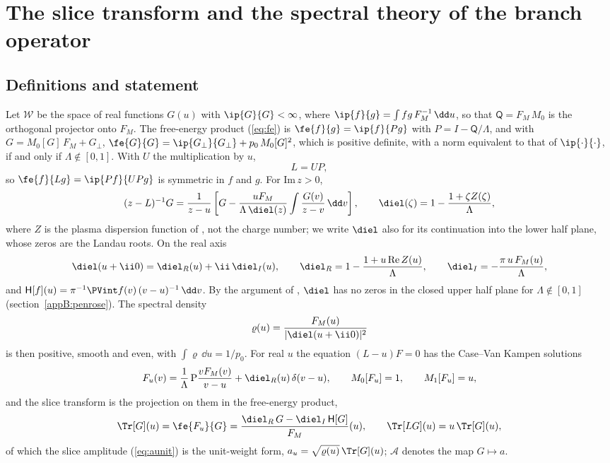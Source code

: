 \section{The slice transform and the spectral theory of the branch operator}\label{app:spectral}

\subsection{Definitions and statement}\label{appB:defs}

Let $\mathcal W$ be the space of real functions $G(u)$ with $\ip{G}{G}<\infty$, where $\ip{f}{g}=\int fg\,F_M^{-1}\,\dd u$, so that $\mathsf Q=F_M\,M_0$ is the orthogonal projector onto $F_M$. The free-energy product (\ref{eq:fe}) is $\fe{f}{g}=\ip{f}{Pg}$ with $P=I-\mathsf Q/\Lambda$, and with $G=M_0[G]\,F_M+G_\perp$, $\fe{G}{G}=\ip{G_\perp}{G_\perp}+p_0\,M_0[G]^2$, which is positive definite, with a norm equivalent to that of $\ip{\cdot}{\cdot}$, if and only if $\Lambda\notin[0,1]$. With $U$ the multiplication by $u$,
\begin{equation}\label{eq:LUP}
  L=UP ,
\end{equation}
so $\fe{f}{Lg}=\ip{Pf}{UPg}$ is symmetric in $f$ and $g$. For $\mathrm{Im}\,z>0$,
\begin{equation}\label{sl:resolvent}
  (z-L)^{-1}G=\frac{1}{z-u}\left[G-\frac{uF_M}{\Lambda\,\diel(z)}\int\frac{G(v)}{z-v}\,\dd v\right],\qquad
  \diel(\zeta)=1-\frac{1+\zeta Z(\zeta)}{\Lambda},
\end{equation}
where $Z$ is the plasma dispersion function of \citet{FriedConte1961}, not the charge number; we write $\diel$ also for its continuation into the lower half plane, whose zeros are the Landau roots. On the real axis
\begin{equation}\label{sl:epsRI}
  \diel(u+\ii0)=\diel_R(u)+\ii\,\diel_I(u),\qquad
  \diel_R=1-\frac{1+u\,\mathrm{Re}\,Z(u)}{\Lambda},\qquad
  \diel_I=-\frac{\pi\,u\,F_M(u)}{\Lambda},
\end{equation}
and $\mathsf H[f](u)=\pi^{-1}\PVint f(v)\,(v-u)^{-1}\,\dd v$. By the argument of \citet{Penrose1960}, $\diel$ has no zeros in the closed upper half plane for $\Lambda\notin[0,1]$ (section~\ref{appB:penrose}). The spectral density
\begin{equation}\label{eq:varrho}
  \varrho(u)=\frac{F_M(u)}{|\diel(u+\ii0)|^2}
\end{equation}
is then positive, smooth and even, with $\int\varrho\,\dd u=1/p_0$. For real $u$ the equation $(L-u)F=0$ has the Case--Van Kampen solutions
\begin{equation}\label{sl:Fu}
  F_u(v)=\frac{1}{\Lambda}\,\mathrm P\frac{vF_M(v)}{v-u}+\diel_R(u)\,\delta(v-u),\qquad M_0[F_u]=1,\qquad M_1[F_u]=u,
\end{equation}
and the slice transform is the projection on them in the free-energy product,
\begin{equation}\label{eq:transform}
  \Tr[G](u)=\fe{F_u}{G}=\frac{\diel_R\,G-\diel_I\,\mathsf H[G]}{F_M}(u),\qquad \Tr[LG](u)=u\,\Tr[G](u),
\end{equation}
of which the slice amplitude (\ref{eq:aunit}) is the unit-weight form, $a_u=\sqrt{\varrho(u)}\,\Tr[G](u)$; $\mathcal A$ denotes the map $G\mapsto a$.

